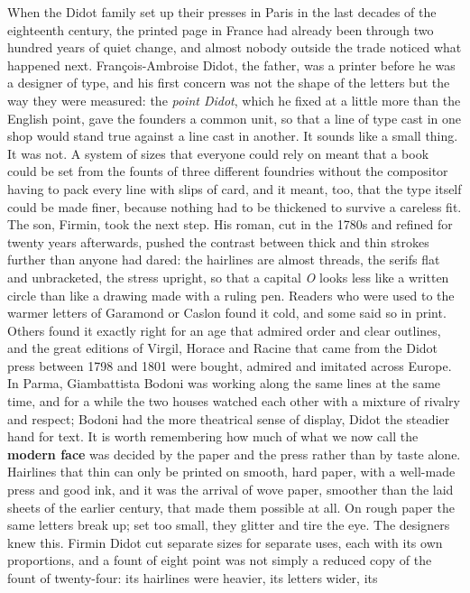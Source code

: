 \documentclass[10.5pt]{article}
\newcommand\smc[1]{{\addfontfeature{Letters=SmallCaps}#1}}
\begin{document}
\smc{When the Didot family} set up their presses in Paris in the last decades
of the eighteenth century, the printed page in France had already been through
two hundred years of quiet change, and almost nobody outside the trade noticed
what happened next. François-Ambroise Didot, the father, was a printer before he
was a designer of type, and his first concern was not the shape of the letters
but the way they were measured: the \emph{point Didot}, which he fixed at a
little more than the English point, gave the founders a common unit, so that a
line of type cast in one shop would stand true against a line cast in another.
It sounds like a small thing. It was not. A system of sizes that everyone could
rely on meant that a book could be set from the founts of three different
foundries without the compositor having to pack every line with slips of card,
and it meant, too, that the type itself could be made finer, because nothing had
to be thickened to survive a careless fit. The son, Firmin, took the next step.
His roman, cut in the 1780s and refined for twenty years afterwards, pushed the
contrast between thick and thin strokes further than anyone had dared: the
hairlines are almost threads, the serifs flat and unbracketed, the stress
upright, so that a capital \emph{O} looks less like a written circle than like
a drawing made with a ruling pen. Readers who were used to the warmer letters
of Garamond or Caslon found it cold, and some said so in print. Others found it
exactly right for an age that admired order and clear outlines, and the great
editions of Virgil, Horace and Racine that came from the Didot press between 1798
and 1801 were bought, admired and imitated across Europe. In Parma, Giambattista
Bodoni was working along the same lines at the same time, and for a while the
two houses watched each other with a mixture of rivalry and respect; Bodoni
had the more theatrical sense of display, Didot the steadier hand for text. It
is worth remembering how much of what we now call the \textbf{modern face} was
decided by the paper and the press rather than by taste alone. Hairlines that
thin can only be printed on smooth, hard paper, with a well-made press and good
ink, and it was the arrival of wove paper, smoother than the laid sheets of the
earlier century, that made them possible at all. On rough paper the same
letters break up; set too small, they glitter and tire the eye. The designers
knew this. Firmin Didot cut separate sizes for separate uses, each with its own
proportions, and a fount of eight point was not simply a reduced copy of the
fount of twenty-four: its hairlines were heavier, its letters wider, its
\end{document}
